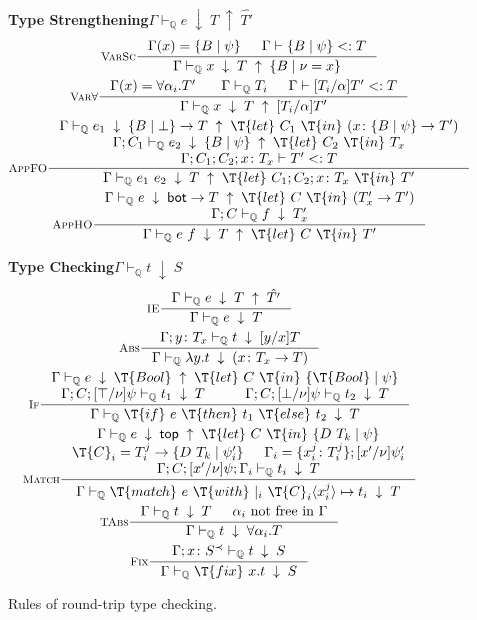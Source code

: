 \documentclass[10pt,preprint]{sigplanconf-pldi16}
\theoremstyle{definition}
\newcommand{\Subt}{<:}
\newcommand{\App}[2]{{#1}\ {#2}}
\newcommand{\env}{\Gamma}
\newcommand{\produce}{\;\uparrow\;}
\newcommand{\consume}{\;\downarrow\;}
\newcommand{\funT}[3]{{#1}\colon {#2} \to {#3}}
\newcommand{\before}{\prec}
\newcommand{\ttop}{\mathsf{top}}
\newcommand{\tbot}{\mathsf{bot}}
\newcommand{\contT}[2]{\T{let}\ {#1}\ \T{in}\ {#2}}
\newcommand{\quals}{\mathbb{Q}}
\newcommand{\entailsQ}{\vdash_{\quals}}
\begin{document}
\begin{figure}
\small
\textbf{Type Strengthening}\quad$\boxed{\env \entailsQ e \consume T \produce \hat{T'}}$
\begin{gather*}
\inference[\textsc{VarSc}]
{\env(x) =\{B \mid \psi\} & \env\vdash\{B \mid \psi\}\Subt T}
{\env \entailsQ x \consume T \produce \{B\mid\nu = x\} }
\\
\inference[\textsc{Var$\forall$}]
{\env(x)=\forall\alpha_i.T'\ &  \env \entailsQ T_i & \env\vdash[T_i/\alpha]T' \Subt T}
{\env \entailsQ x \consume T \produce [T_i/\alpha]T'}
\\
\inference[\textsc{AppFO}]
{\env \entailsQ e_1 \consume \{B \mid \bot\}\to T \produce \contT{C_1}{(\funT{x}{\{B \mid \psi\}}{T'})}    \\  
\env;C_1 \entailsQ e_2 \consume \{B \mid \psi\} \produce \contT{C_2}{T_x} \\
\env;C_1;C_2;x\colon T_x \vdash T' \Subt T}
{\env \entailsQ \App{e_1}{e_2} \consume T \produce \contT{C_1;C_2;x\colon T_x}{T'} }
\\
\inference[\textsc{AppHO}]
{\env \entailsQ e \consume \tbot\to T \produce \contT{C}{(T'_x \to T')}    \\  \env;C \entailsQ f \consume T'_x}
{\env \entailsQ \App{e}{f} \consume T \produce \contT{C}{T'}}
\end{gather*}

\textbf{Type Checking}\quad$\boxed{\env \entailsQ t \consume S}$
\begin{gather*}
\inference[\textsc{IE}]
{\env \entailsQ e \consume T \produce \hat{T'}}
{\env \entailsQ e \consume T}
\\
\inference[\textsc{Abs}]
{\env;y\colon T_x \entailsQ t \consume [y/x]T}
{\env \entailsQ \lambda y.t \consume (\funT{x}{T_x}{T})}
\\
\inference[\textsc{If}]
{\env \entailsQ e \consume \T{Bool} \produce \contT{C}{\{\T{Bool}\mid \psi\}} \\
\env;C;[\top/\nu]\psi \entailsQ t_1 \consume T  &  
\env;C;[\bot/\nu]\psi \entailsQ t_2 \consume T}
{\env \entailsQ\T{if}\ e\ \T{then}\ t_1\ \T{else}\ t_2 \consume T}
\\
\inference[\textsc{Match}]
{\env \entailsQ e \consume \ttop \produce \contT{C}{\{D\ T_k\mid\psi\}}  \\
\T{C}_i = T_i^j \to \{D\ T_k\mid\psi'_i\}    &
\env_i = \{x_i^j\colon T_i^j\};[x'/\nu]\psi'_i \\
\env;C;[x'/\nu]\psi;\env_i \entailsQ t_i \consume T}
{\env \entailsQ \T{match}\ e\ \T{with}\ |_i\ \T{C}_i \langle x_i^j\rangle \mapsto t_i \consume T}
\\
\inference[\textsc{TAbs}]
{\env \entailsQ t \consume T  &  \alpha_i\ \text{not free in}\ \env}
{\env \entailsQ t \consume \forall\alpha_i.T}
\\
\inference[\textsc{Fix}]
{\env;x\colon S^\before \entailsQ t \consume S}
{\env \entailsQ \T{fix}\ x.t \consume S}
\end{gather*}
\caption{Rules of round-trip type checking.}\label{fig:round-trip}
\end{figure}
\end{document}
